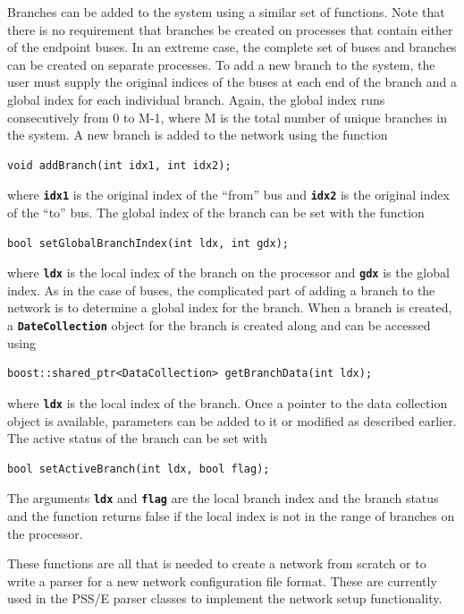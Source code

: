 Branches can be added to the system using a similar set of functions. Note that there is no requirement that branches be created on processes that contain either of the endpoint buses. In an extreme case, the complete set of buses and branches can be created on separate processes. To add a new branch to the system, the user must supply the original indices of the buses at each end of the branch and a global index for each individual branch. Again, the global index runs consecutively from 0 to M-1, where M is the total number of unique branches in the system. A new branch is added to the network using the function

{
\color{red}
\begin{Verbatim}[fontseries=b]
void addBranch(int idx1, int idx2);
\end{Verbatim}
}

where \texttt{\textbf{idx1}} is the original index of the ``from'' bus and \texttt{\textbf{idx2}} is the original index of the ``to'' bus. The global index of the branch can be set with the function

{
\color{red}
\begin{Verbatim}[fontseries=b]
bool setGlobalBranchIndex(int ldx, int gdx);
\end{Verbatim}
}

where \texttt{\textbf{ldx}} is the local index of the branch on the processor and \texttt{\textbf{gdx}} is the global index. As in the case of buses, the complicated part of adding a branch to the network is to determine a global index for the branch.
When a branch is created, a \texttt{\textbf{DateCollection}} object for the branch is created along and can be accessed using

{
\color{red}
\begin{Verbatim}[fontseries=b]
boost::shared_ptr<DataCollection> getBranchData(int ldx);
\end{Verbatim}
}

where \texttt{\textbf{ldx}} is the local index of the branch. Once a pointer to the data collection object is available, parameters can be added to it or modified as described earlier. The active status of the branch can be set with

{
\color{red}
\begin{Verbatim}[fontseries=b]
bool setActiveBranch(int ldx, bool flag);
\end{Verbatim}
}

The arguments \texttt{\textbf{ldx}} and \texttt{\textbf{flag}} are the local branch index and the branch status and the function returns false if the local index is not in the range of branches on the processor.

These functions are all that is needed to create a network from scratch or to write a parser for a new network configuration file format. These are currently used in the PSS/E parser classes to implement the network setup functionality.
\newline
\hyperlink{topDoc}{\color{blue}{Top}}
